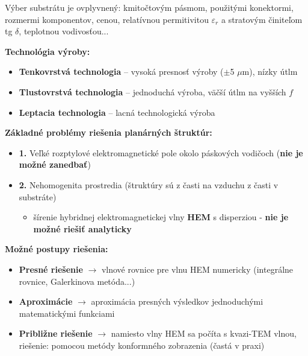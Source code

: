 	Výber substrátu je ovplyvnený: kmitočtovým pásmom, použitými konektormi, rozmermi komponentov, cenou, relatívnou permitivitou $\varepsilon_r$ a stratovým činiteľom tg $\delta$, teplotnou vodivosťou...\par 
	
	\textbf{Technológia výroby:}
	\begin{itemize}[label=--]
		\item \textbf{Tenkovrstvá technologia} --  vysoká presnosť výroby ($\pm$5 $\mu$m), nízky útlm
		\item \textbf{Tlustovrstvá technologia} -- jednoduchá výroba, väčší útlm na vyšších $f$
		\item \textbf{Leptacia technologia} -- lacná technologická výroba
	\end{itemize}
	
	\textbf{Základné problémy riešenia planárných štruktúr:}
	 \begin{itemize}[label=--]
	 	\item \textbf{1.} Veľké rozptylové elektromagnetické pole okolo páskových vodičoch (\textbf{nie je možné zanedbať})
	 	\item \textbf{2.} Nehomogenita prostredia (štruktúry sú z časti na vzduchu z časti v substráte)
	 	\begin{itemize}[label=$\rightarrow$]
	 		\item  šírenie hybridnej elektromagnetickej vlny \textbf{HEM} s disperziou - \textbf{nie je možné riešiť analyticky} 
 		\end{itemize}
	 \end{itemize}
	\textbf{Možné postupy riešenia:}
	\begin{itemize}[label=--]
		\item \textbf{Presné riešenie} $\rightarrow$ vlnové rovnice pre vlnu HEM numericky (integrálne rovnice, Galerkinova metóda...)
		\item \textbf{Aproximácie} $\rightarrow$ aproximácia presných výsledkov jednoduchými matematickými funkciami
		\item \textbf{Približne riešenie} $\rightarrow$ namiesto vlny HEM sa počíta s kvazi-TEM vlnou, riešenie: pomocou metódy konformného zobrazenia (častá v praxi) 
	\end{itemize}

